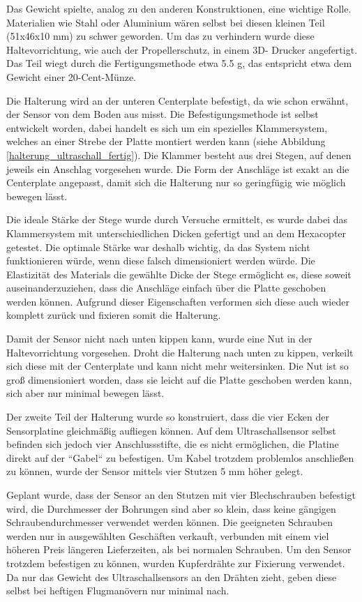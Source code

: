 	Das Gewicht spielte, analog zu den anderen Konstruktionen, eine wichtige Rolle.
	Materialien wie Stahl oder Aluminium wären selbst bei diesen kleinen Teil (51x46x10 mm) zu schwer geworden.
	Um das zu verhindern wurde diese Haltevorrichtung, wie auch der Propellerschutz, in einem 3D- Drucker angefertigt.
	Das Teil wiegt durch die Fertigungsmethode etwa 5.5 g, das entspricht etwa dem Gewicht einer 20-Cent-Münze.

			\newpage

	Die Halterung wird an der unteren Centerplate befestigt, da wie schon erwähnt, der Sensor von dem Boden aus misst.
	Die Befestigungsmethode ist selbst entwickelt worden, dabei handelt es sich um ein spezielles Klammersystem, welches an einer Strebe der Platte montiert werden kann (siehe Abbildung \ref{halterung_ultraschall_fertig}).
	Die Klammer besteht aus drei Stegen, auf denen jeweils ein Anschlag vorgesehen wurde.
	Die Form der Anschläge ist  exakt an die Centerplate angepasst, damit sich die Halterung nur so geringfügig wie möglich bewegen lässt.

	Die ideale Stärke der Stege wurde durch Versuche ermittelt, es wurde dabei das Klammersystem mit unterschiedlichen Dicken gefertigt und an dem Hexacopter getestet.
	Die optimale Stärke war deshalb wichtig, da das System nicht funktionieren würde, wenn diese falsch dimensioniert werden würde.
	Die Elastizität des Materials \bzw die gewählte Dicke der Stege ermöglicht es, diese soweit auseinanderzuziehen, dass die Anschläge einfach über die Platte geschoben werden können.
	Aufgrund dieser Eigenschaften verformen sich diese auch wieder komplett zurück und fixieren somit die Halterung.

	Damit der Sensor nicht nach unten kippen kann, wurde eine Nut in der Haltevorrichtung vorgesehen.
	Droht die Halterung nach unten zu kippen, verkeilt sich diese mit der Centerplate und kann nicht mehr weitersinken.
	Die Nut ist so groß dimensioniert worden, dass sie leicht auf die Platte geschoben werden kann, sich aber nur minimal bewegen lässt.

	Der zweite Teil der Halterung wurde so konstruiert, dass die vier Ecken der Sensorplatine gleichmäßig aufliegen können.
	Auf dem Ultraschallsensor selbst befinden sich jedoch vier Anschlussstifte, die es nicht ermöglichen, die Platine direkt auf der “Gabel“ zu befestigen.
	Um Kabel trotzdem problemlos anschließen zu können, wurde der Sensor mittels vier Stutzen 5 mm höher gelegt.

	Geplant wurde, dass der Sensor an den Stutzen mit vier Blechschrauben befestigt wird, die Durchmesser der Bohrungen sind aber so klein, dass keine gängigen Schraubendurchmesser verwendet werden können.
	Die geeigneten Schrauben werden nur in ausgewählten Geschäften verkauft, verbunden mit einem viel höheren Preis \bzw längeren Lieferzeiten, als bei normalen Schrauben.
	Um den Sensor trotzdem befestigen zu können, wurden Kupferdrähte zur Fixierung verwendet.
	Da nur das Gewicht des Ultraschallsensors an den Drähten zieht, geben diese selbst bei heftigen Flugmanövern nur minimal nach.

